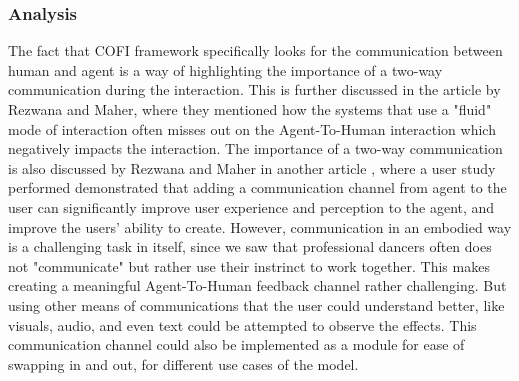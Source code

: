\documentclass[final,5p,times,twocolumn,authoryear]{article}
\begin{document}
\subsubsection{Analysis}

The fact that COFI framework specifically looks for the communication
between human and agent is a way of highlighting the importance of a
two-way communication during the interaction. This is further discussed
in the article by Rezwana and Maher, where they mentioned how the
systems that use a "fluid" mode of interaction often misses out on the
Agent-To-Human interaction which negatively impacts the interaction. The
importance of a two-way communication is also discussed by Rezwana and
Maher in another article \cite{Rezwana2022}, where a user study
performed demonstrated that adding a communication channel from agent to
the user can significantly improve user experience and perception to
the agent, and improve the users' ability to create. However,
communication in an embodied way is a challenging task in itself, since
we saw that professional dancers often does not "communicate" but rather
use their instrinct to work together. This makes creating a meaningful
Agent-To-Human feedback channel rather challenging. But using other
means of communications that the user could understand better, like
visuals, audio, and even text could be attempted to observe the effects.
This communication channel could also be implemented as a module for
ease of swapping in and out, for different use cases of the model.
\end{document}
